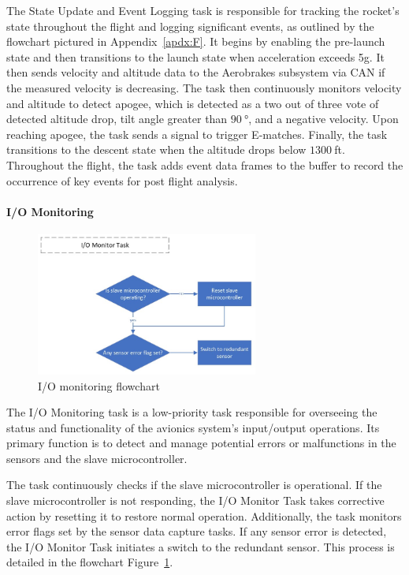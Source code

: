 The State Update and Event Logging task is responsible for tracking the rocket's state throughout the flight and logging significant events, as outlined by the flowchart pictured in Appendix~\ref{apdx:F}. It begins by enabling the pre-launch state and then transitions to the launch state when acceleration exceeds 5g. It then sends velocity and altitude data to the Aerobrakes subsystem via CAN if the measured velocity is decreasing. The task then continuously monitors velocity and altitude to detect apogee, which is detected as a two out of three vote of detected altitude drop, tilt angle greater than $\SI{90}{\degree}$, and a negative velocity. Upon reaching apogee, the task sends a signal to trigger E-matches. Finally, the task transitions to the descent state when the altitude drops below $\SI{1300}{}$ft. Throughout the flight, the task adds event data frames to the buffer to record the occurrence of key events for post flight analysis. 

\paragraph{I/O Monitoring}
\begin{figure}[ht!]
  \begin{center}
    \hspace{-3.5cm}\includegraphics[width=0.65\textwidth]{./img/Section_4_2_2_4.jpeg}
  \end{center}
  \caption{I/O monitoring flowchart}\label{fig:flowchart-IO}
\end{figure}

The I/O Monitoring task is a low-priority task responsible for overseeing the status and functionality of the avionics system's input/output operations. Its primary function is to detect and manage potential errors or malfunctions in the sensors and the slave microcontroller. 

The task continuously checks if the slave microcontroller is operational. If the slave microcontroller is not responding, the I/O Monitor Task takes corrective action by resetting it to restore normal operation. Additionally, the task monitors error flags set by the sensor data capture tasks. If any sensor error is detected, the I/O Monitor Task initiates a switch to the redundant sensor. This process is detailed in the flowchart Figure~\ref{fig:flowchart-IO}.

